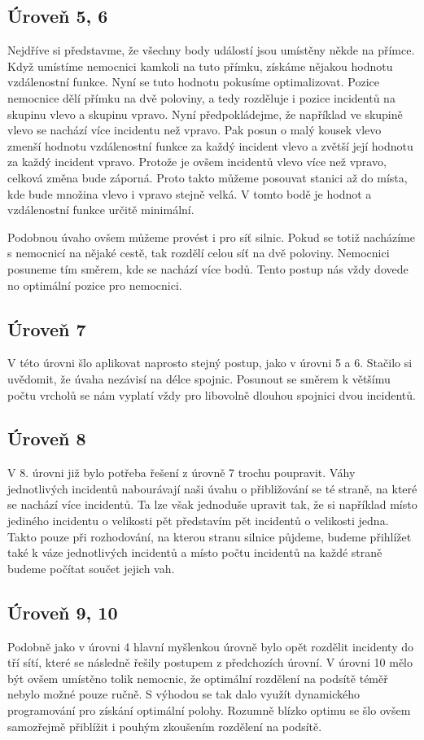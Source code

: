 \documentclass[12pt,a4paper]{article}
\begin{document}
\subsection*{Úroveň 5, 6}
Nejdříve si představme, že všechny body událostí jsou umístěny někde na přímce. Když umístíme nemocnici kamkoli na tuto přímku, získáme nějakou hodnotu vzdálenostní funkce.
Nyní se tuto hodnotu pokusíme optimalizovat. Pozice nemocnice dělí přímku na dvě poloviny, a tedy rozděluje i pozice incidentů na skupinu vlevo a skupinu vpravo.
Nyní předpokládejme, že například ve skupině vlevo se nachází více incidentu než vpravo. Pak posun o malý kousek vlevo zmenší hodnotu vzdálenostní funkce za každý incident vlevo a zvětší její hodnotu za každý incident vpravo.
Protože je ovšem incidentů vlevo více než vpravo, celková změna bude záporná. Proto takto můžeme posouvat stanici až do místa, kde bude množina vlevo i vpravo stejně velká.
V tomto bodě je hodnot a vzdálenostní funkce určitě minimální.

Podobnou úvaho ovšem můžeme provést i pro síť silnic. Pokud se totiž nacházíme s nemocnicí na nějaké cestě, tak rozdělí celou síť na dvě poloviny. Nemocnici posuneme tím směrem, kde se nachází více bodů.
Tento postup nás vždy dovede no optimální pozice pro nemocnici.

\subsection*{Úroveň 7}
V této úrovni šlo aplikovat naprosto stejný postup, jako v úrovni 5 a 6. Stačilo si uvědomit, že úvaha nezávisí na délce spojnic. Posunout se směrem k většímu počtu vrcholů se nám vyplatí vždy pro libovolně dlouhou spojnici dvou incidentů.

\subsection*{Úroveň 8}
V 8. úrovni již bylo potřeba řešení z úrovně 7 trochu poupravit. Váhy jednotlivých incidentů nabourávají naši úvahu o přibližování se té straně, na které se nachází více incidentů.
Ta lze však jednoduše upravit tak, že si například místo jediného incidentu o velikosti pět představím pět incidentů o velikosti jedna. Takto pouze při rozhodování, na kterou stranu silnice půjdeme, budeme přihlížet také k váze jednotlivých incidentů a místo počtu incidentů na každé straně budeme počítat součet jejich vah.

\subsection*{Úroveň 9, 10}
Podobně jako v úrovni 4 hlavní myšlenkou úrovně bylo opět rozdělit incidenty do tří sítí, které se následně řešily postupem z předchozích úrovní. V úrovni 10 mělo být ovšem umístěno tolik nemocnic, že optimální rozdělení na podsítě téměř nebylo možné pouze ručně. S výhodou se tak dalo využít dynamického programování pro získání optimální polohy. Rozumně blízko optimu se šlo ovšem samozřejmě přiblížit i pouhým zkoušením rozdělení na podsítě.
\end{document}
